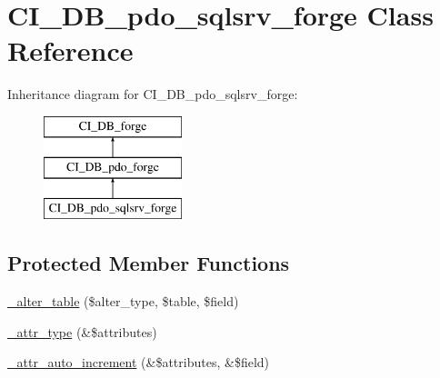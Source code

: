 \hypertarget{class_c_i___d_b__pdo__sqlsrv__forge}{}\section{C\+I\+\_\+\+D\+B\+\_\+pdo\+\_\+sqlsrv\+\_\+forge Class Reference}
\label{class_c_i___d_b__pdo__sqlsrv__forge}
Inheritance diagram for C\+I\+\_\+\+D\+B\+\_\+pdo\+\_\+sqlsrv\+\_\+forge\+:\begin{figure}[H]
\begin{center}
\leavevmode
\includegraphics[height=3.000000cm]{class_c_i___d_b__pdo__sqlsrv__forge}
\end{center}
\end{figure}
\subsection*{Protected Member Functions}
\begin{DoxyCompactItemize}
\item 
\mbox{\hyperlink{class_c_i___d_b__pdo__sqlsrv__forge_a41c6cae02f2fda8b429ad0afb9509426}{\+\_\+alter\+\_\+table}} (\$alter\+\_\+type, \$table, \$field)
\item 
\mbox{\hyperlink{class_c_i___d_b__pdo__sqlsrv__forge_a8553be952084c6f7cdfff370a1d14f6b}{\+\_\+attr\+\_\+type}} (\&\$attributes)
\item 
\mbox{\hyperlink{class_c_i___d_b__pdo__sqlsrv__forge_a2a013a5932439c3c44f0dad3436525f7}{\+\_\+attr\+\_\+auto\+\_\+increment}} (\&\$attributes, \&\$field)
\end{DoxyCompactItemize}
